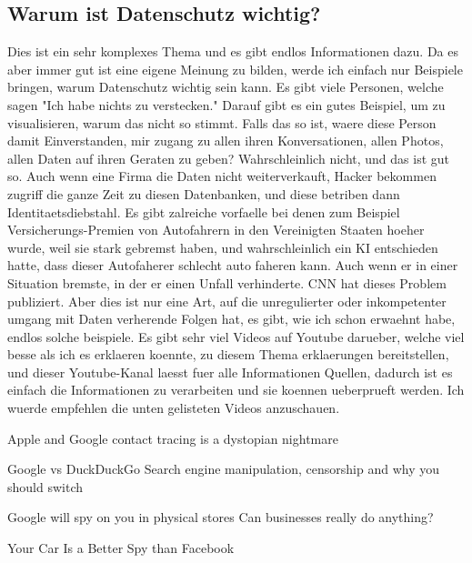 \documentclass{report}
\begin{document}
\subsection{Warum ist Datenschutz wichtig?}
Dies ist ein sehr komplexes Thema und es gibt endlos Informationen dazu. Da es aber immer gut ist eine eigene Meinung zu bilden, werde ich einfach nur Beispiele bringen, warum Datenschutz wichtig sein kann. Es gibt viele Personen, welche sagen "Ich habe nichts zu verstecken." Darauf gibt es ein gutes Beispiel, um zu visualisieren, warum das nicht so stimmt. Falls das so ist, waere diese Person damit Einverstanden, mir zugang zu allen ihren Konversationen, allen Photos, allen Daten auf ihren Geraten zu geben? Wahrschleinlich nicht, und das ist gut so. Auch wenn eine Firma die Daten nicht weiterverkauft, Hacker bekommen zugriff die ganze Zeit zu diesen Datenbanken, und diese betriben dann Identitaetsdiebstahl. 
\newline
Es gibt zalreiche vorfaelle bei denen zum Beispiel Versicherungs-Premien von Autofahrern in den Vereinigten Staaten hoeher wurde, weil sie stark gebremst haben, und wahrschleinlich ein KI entschieden hatte, dass dieser Autofaherer schlecht auto faheren kann. Auch wenn er in einer Situation bremste, in der er einen Unfall verhinderte. CNN hat dieses Problem publiziert. \citep{car-syping-cnn}
\newline
Aber dies ist nur eine Art, auf die unregulierter oder inkompetenter umgang mit Daten verherende Folgen hat, es gibt, wie ich schon erwaehnt habe, endlos solche beispiele.
\newline
Es gibt sehr viel Videos auf Youtube darueber, welche viel besse als ich es erklaeren koennte, zu diesem Thema erklaerungen bereitstellen, und dieser Youtube-Kanal \citep{tha-hated-one-yt-channel} laesst fuer alle Informationen Quellen, dadurch ist es einfach die Informationen zu verarbeiten und sie koennen ueberprueft werden.
Ich wuerde empfehlen die unten gelisteten Videos anzuschauen.

Apple and Google contact tracing is a dystopian nightmare \citep{contact-tracing}

Google vs DuckDuckGo Search engine manipulation, censorship and why you should switch \citep{google-DuckDuckGo}

Google will spy on you in physical stores Can businesses really do anything? \citep{offline-tracking-google}

Your Car Is a Better Spy than Facebook \citep{car-better-spy-than-facebook}
\end{document}
